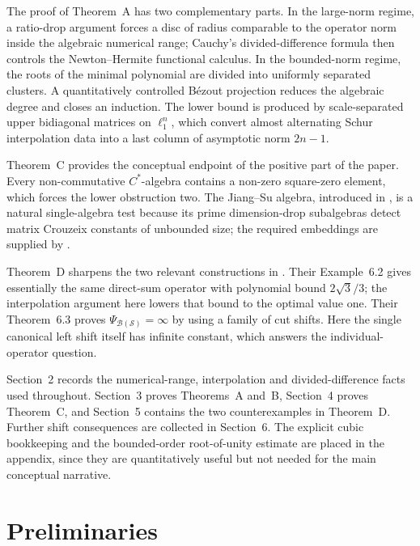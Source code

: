 \documentclass[a4paper]{amsart}
\theoremstyle{remark}
\newcommand{\calB}{\mathcal B}
\newcommand{\calS}{\mathcal S}
\begin{document}
The proof of Theorem~A has two complementary parts.  In the large-norm regime,
a ratio-drop argument forces a disc of radius comparable to the operator norm
inside the algebraic numerical range; Cauchy's divided-difference formula then
controls the Newton--Hermite functional calculus.  In the bounded-norm regime,
the roots of the minimal polynomial are divided into uniformly separated
clusters.  A quantitatively controlled B\'ezout projection reduces the
algebraic degree and closes an induction.  The lower bound is produced by
scale-separated upper bidiagonal matrices on \(\ell_1^n\), which convert
almost alternating Schur interpolation data into a last column of asymptotic
norm \(2n-1\).

Theorem~C provides the conceptual endpoint of the positive part of the paper.  Every non-commutative \(C^*\)-algebra contains a non-zero
square-zero element, which forces the lower obstruction two.  The Jiang--Su
algebra, introduced in \cite{JiangSu}, is a natural single-algebra test because
its prime dimension-drop subalgebras detect matrix Crouzeix constants of
unbounded size; the required embeddings are supplied by
\cite[Theorem~2.2 and Proposition~3.3]{RordamWinter}.

Theorem~D sharpens the two relevant constructions in \cite{BHDVW}.  Their
Example~6.2 gives essentially the same direct-sum operator with polynomial
bound \(2\sqrt3/3\); the interpolation argument here lowers that bound to the
optimal value one.  Their Theorem~6.3 proves
\(\Psi_{\calB(\calS)}=\infty\) by using a family of cut shifts.  Here the
single canonical left shift itself has infinite constant, which answers the
individual-operator question.

Section~2 records the numerical-range, interpolation and divided-difference
facts used throughout.  Section~3 proves Theorems~A and~B, Section~4 proves
Theorem~C, and Section~5 contains the two counterexamples in Theorem~D.
Further shift consequences are collected in Section~6.  The explicit cubic
bookkeeping and the bounded-order root-of-unity estimate are placed in the
appendix, since they are quantitatively useful but not needed for the main
conceptual narrative.

\section{Preliminaries}
\end{document}
